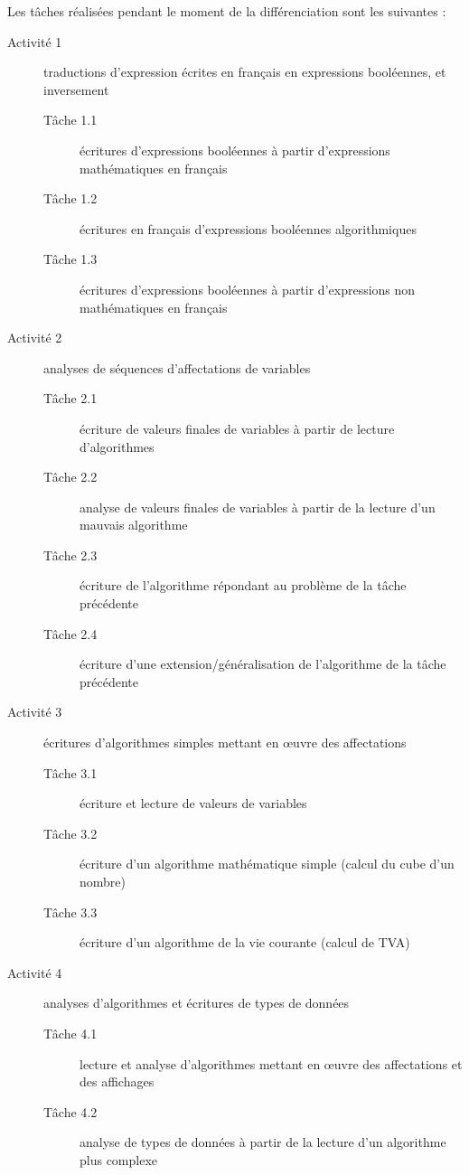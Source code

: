 Les tâches réalisées pendant le moment de la différenciation sont les suivantes :

\begin{description}
    \item[Activité 1] traductions d'expression écrites en français en expressions booléennes, et inversement
    \begin{description}
        \item[Tâche 1.1] écritures d'expressions booléennes à partir d'expressions mathématiques en français
        \item[Tâche 1.2] écritures en français d'expressions booléennes algorithmiques
        \item[Tâche 1.3] écritures d'expressions booléennes à partir d'expressions non mathématiques en français
    \end{description}

    \item[Activité 2] analyses de séquences d'affectations de variables
    \begin{description}
        \item[Tâche 2.1] écriture de valeurs finales de variables à partir de lecture d'algorithmes 
        \item[Tâche 2.2] analyse de valeurs finales de variables à partir de la lecture d'un mauvais algorithme
        \item[Tâche 2.3] écriture de l'algorithme répondant au problème de la tâche précédente
        \item[Tâche 2.4] écriture d'une extension/généralisation de l'algorithme de la tâche précédente
    \end{description} 

    \item[Activité 3] écritures d'algorithmes simples mettant en œuvre des affectations
    \begin{description}
        \item[Tâche 3.1] écriture et lecture de valeurs de variables 
        \item[Tâche 3.2] écriture d'un algorithme mathématique simple (calcul du cube d'un nombre)
        \item[Tâche 3.3] écriture d'un algorithme de la vie courante (calcul de TVA)
    \end{description}

    \item[Activité 4] analyses d'algorithmes et écritures de types de données
    \begin{description}
        \item[Tâche 4.1] lecture et analyse d'algorithmes mettant en œuvre des affectations et des affichages
        \item[Tâche 4.2] analyse de types de données à partir de la lecture d'un algorithme plus complexe
    \end{description} 
\end{description}


